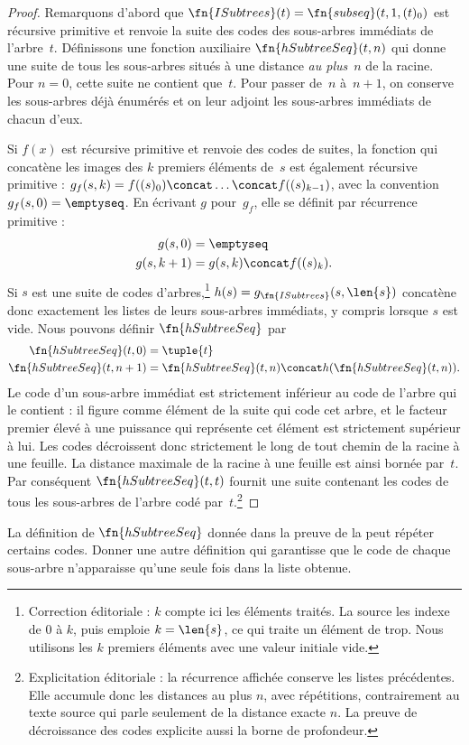 \documentclass[../../../include/open-logic-section]{subfiles}
\begin{document}
\begin{proof}
  Remarquons d'abord que
  $\fn{ISubtrees}(t)=\fn{subseq}(t,1,(t)_0)$
  est récursive primitive et renvoie la suite des codes
  des sous-arbres immédiats de l'arbre~$t$.
  Définissons une fonction auxiliaire
  $\fn{hSubtreeSeq}(t,n)$ qui donne une suite de tous les
  sous-arbres situés à une distance \emph{au plus}~$n$
  de la racine. Pour $n=0$, cette suite ne contient que~$t$.
  Pour passer de~$n$ à~$n+1$, on conserve les sous-arbres
  déjà énumérés et on leur adjoint les sous-arbres immédiats
  de chacun d'eux.

  Si $f(x)$ est récursive primitive et renvoie des codes de
  suites, la fonction qui concatène les images des $k$
  premiers éléments de~$s$ est également récursive primitive :
  $g_f(s,k)=f((s)_0)\concat\dots\concat f((s)_{k-1})$,
  avec la convention $g_f(s,0)=\emptyseq$. En écrivant
  $g$ pour~$g_f$, elle se définit par récurrence primitive :
  \begin{align*}
    g(s, 0) & = \emptyseq\\
    g(s, k+1) & = g(s, k) \concat f((s)_k).
  \end{align*}
  Si $s$ est une suite de codes d'arbres,\footnote{Correction éditoriale : $k$ compte ici les éléments traités. La source les indexe de $0$ à $k$, puis emploie $k=\len{s}$, ce qui traite un élément de trop. Nous utilisons les $k$ premiers éléments avec une valeur initiale vide.}
  $h(s)=g_{\fn{ISubtrees}}(s,\len{s})$ concatène donc
  exactement les listes de leurs sous-arbres immédiats,
  y compris lorsque $s$ est vide. Nous pouvons définir
  $\fn{hSubtreeSeq}$ par
  \begin{align*}
    \fn{hSubtreeSeq}(t, 0) & = \tuple{t} \\
    \fn{hSubtreeSeq}(t, n+1) & = \fn{hSubtreeSeq}(t, n) \concat
      h(\fn{hSubtreeSeq}(t, n)).
  \end{align*}
  Le code d'un sous-arbre immédiat est strictement inférieur
  au code de l'arbre qui le contient : il figure comme
  élément de la suite qui code cet arbre, et le facteur
  premier élevé à une puissance qui représente cet élément
  est strictement supérieur à lui. Les codes
  décroissent donc strictement le long de tout chemin
  de la racine à une feuille. La distance maximale de la
  racine à une feuille est ainsi bornée par~$t$.
  Par conséquent $\fn{hSubtreeSeq}(t,t)$ fournit une suite
  contenant les codes de tous les sous-arbres de l'arbre
  codé par~$t$.\footnote{Explicitation éditoriale : la récurrence affichée conserve les listes précédentes. Elle accumule donc les distances au plus $n$, avec répétitions, contrairement au texte source qui parle seulement de la distance exacte $n$. La preuve de décroissance des codes explicite aussi la borne de profondeur.}
\end{proof}

\begin{prob}
  La définition de $\fn{hSubtreeSeq}$ donnée dans la preuve
  de la  peut répéter
  certains codes. Donner une autre définition qui garantisse
  que le code de chaque sous-arbre n'apparaisse qu'une seule
  fois dans la liste obtenue.
\end{prob}
\end{document}
